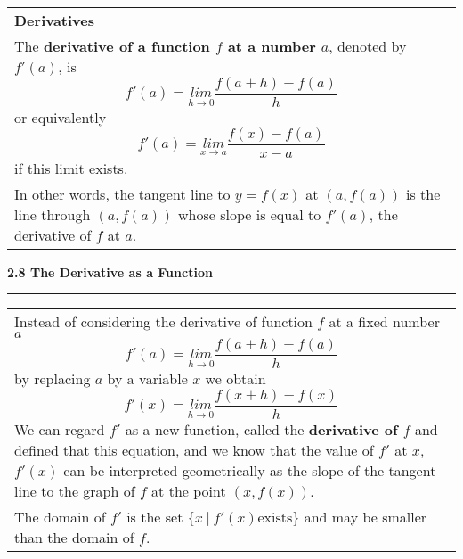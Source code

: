 \documentclass[fleqn]{article}
\begin{document}
\begin{center}
\def\arraystretch{1.3}
{\setlength{\tabcolsep}{16pt}
\begin{tabularx}{.9\textwidth}{|X|}
\hline
	\vspace{1pt}
	\textbf{Derivatives} \\
	The \textbf{derivative of a function $f$ at a number $a$}, denoted by $f'(a)$, is
	$$f'(a) = \underset{h \to 0}{lim} \dfrac{f(a+h) - f(a)}{h}$$
	or equivalently
	$$f'(a) = \underset{x \to a}{lim} \dfrac{f(x) - f(a)}{x-a}$$
	if this limit exists. \\
	In other words, the tangent line to $y=f(x)$ at $(a, f(a))$ is the line through $(a, f(a))$ whose slope is equal to $f'(a)$, the derivative of $f$ at $a$.
	\\[16pt]
	\hline
\end{tabularx}}
\vspace{32pt}

\Large\textbf{2.8 The Derivative as a Function}

\noindent\hfill\rule{0.3\textwidth}{.4pt}\hfill
\vspace{12pt}

\large
\def\arraystretch{1.3}
{\setlength{\tabcolsep}{16pt}
\begin{tabularx}{.9\textwidth}{|X|}
\hline
	\vspace{1pt}
	Instead of considering the derivative of function $f$ at a fixed number $a$
	$$f'(a) = \underset{h \to 0}{lim} \dfrac{f(a+h) - f(a)}{h}$$
	by replacing $a$ by a variable $x$ we obtain
	$$f'(x) = \underset{h \to 0}{lim} \dfrac{f(x+h) - f(x)}{h}$$
	We can regard $f'$ as a new function, called the \textbf{derivative of $f$} and defined that this equation, and we know that the value of $f'$ at $x$, $f'(x)$ can be interpreted geometrically as the slope of the tangent line to the graph of $f$ at the point $(x, f(x))$.\\[5pt]
	The domain of $f'$ is the set $\{x \: | \: f'(x) \text{exists}\}$ and may be smaller than the domain of $f$.
	\\[16pt]
	\hline
\end{tabularx}}
\vspace{12pt}


\end{center}
\end{document}
